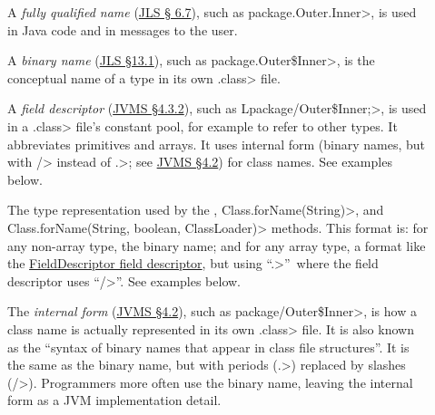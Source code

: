 \begin{description}

\item[]
  A \emph{fully qualified name} (\href{https://docs.oracle.com/javase/specs/jls/se8/html/jls-6.html#jls-6.7}{JLS \S
    6.7}), such as
  \<package.Outer.Inner>, is used in Java code and in messages to
  the user.

\item[]
  A \emph{binary name} (\href{https://docs.oracle.com/javase/specs/jls/se8/html/jls-13.html#jls-13.1}{JLS \S 13.1}), such as
  \<package.Outer\$Inner>, is
  the conceptual name of a type in its own \<.class> file.

\item[]
  A \emph{field descriptor} (\href{https://docs.oracle.com/javase/specs/jvms/se8/html/jvms-4.html#jvms-4.3.2}{JVMS \S 4.3.2}), such as
  \<Lpackage/Outer\$Inner;>, is used in a \<.class> file's constant pool,
  for example to refer to other types.  It abbreviates primitives and
  arrays.  It uses internal form (binary names, but with \</> instead of
  \<.>; see
  \href{https://docs.oracle.com/javase/specs/jvms/se8/html/jvms-4.html#jvms-4.2.1}{JVMS
    \S 4.2}) for class names.  See examples below.

\item[]
\begin{sloppypar}
  The type representation used by the
  , \<Class.forName(String)>,
  and \<Class.forName(String, boolean, ClassLoader)> methods.  This format
  is:  for any non-array type, the binary name; and for any array type, a
  format like the
  \href{https://docs.oracle.com/javase/specs/jvms/se8/html/jvms-4.html#jvms-4.3.2}{FieldDescriptor
    field descriptor}, but using
  ``\<.>''~where the field descriptor uses ``\</>''.  See examples below.
\end{sloppypar}

\item[]
  The \emph{internal form}
  (\href{https://docs.oracle.com/javase/specs/jvms/se7/html/jvms-4.html#jvms-4.2}{JVMS
    \S 4.2}), such as \<package/Outer\$Inner>, is how a class name is
  actually represented in its own \<.class> file.  It is also known as the
  ``syntax of binary names that appear in class file structures''.  It is
  the same as the binary name, but with periods (\<.>) replaced by slashes
  (\</>).  Programmers more often use the binary name, leaving the internal
  form as a JVM implementation detail.


\end{description}
